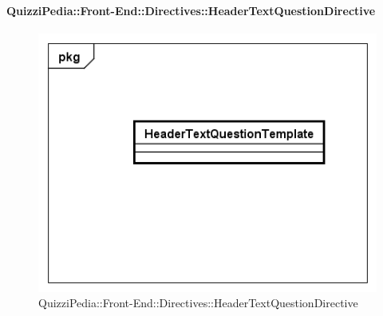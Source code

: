 		\paragraph{QuizziPedia::Front-End::Directives::HeaderTextQuestionDirective}
		
		\label{QuizziPedia::Front-End::Directives::HeaderTextQuestionDirective}
		
		\begin{figure}[ht]
			\centering
			\includegraphics[scale=0.5,keepaspectratio]{UML/Classi/Front-End/QuizziPedia_Front-end_Templates_HeaderTextQuestionTemplate.png}
			\caption{QuizziPedia::Front-End::Directives::HeaderTextQuestionDirective}
		\end{figure} \FloatBarrier
		
